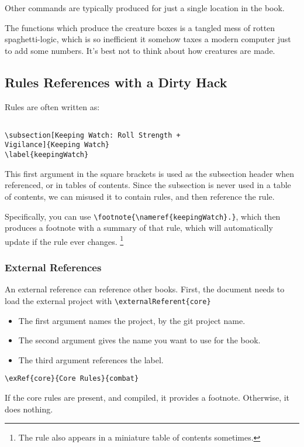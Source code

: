 \documentclass[a4paper,openany]{book}
\begin{document}
\begin{multicols}{2}

Other commands are typically produced for just a single location in the book.

The functions which produce the creature boxes is a tangled mess of rotten spaghetti-logic, which is so inefficient it somehow taxes a modern computer just to add some numbers.
It's best not to think about how creatures are made.

\subsection{Rules References with a Dirty Hack}

Rules are often written as:

\begin{verbatim}

\subsection[Keeping Watch: Roll Strength +
Vigilance]{Keeping Watch}
\label{keepingWatch}

\end{verbatim}

This first argument in the square brackets is used as the subsection header when referenced, or in tables of contents.
Since the subsection is never used in a table of contents, we can misused it to contain rules, and then reference the rule.

Specifically, you can use \verb"\footnote{\nameref{keepingWatch}.}", which then produces a footnote with a summary of that rule, which will automatically update if the rule ever changes.
\footnote{The rule also appears in a miniature table of contents sometimes.}

\subsubsection{External References}

An external reference can reference other books.
First, the document needs to load the external project with \verb"\externalReferent{core}"


\begin{itemize}
  \item
  The first argument names the project, by the git project name.
  \item
  The second argument gives the name you want to use for the book.
  \item
  The third argument references the label.
\end{itemize}

\verb"\exRef{core}{Core Rules}{combat}"

If the core rules are present, and compiled, it provides a footnote.
Otherwise, it does nothing.%

\end{multicols}

\printindex[spells]
\end{document}

